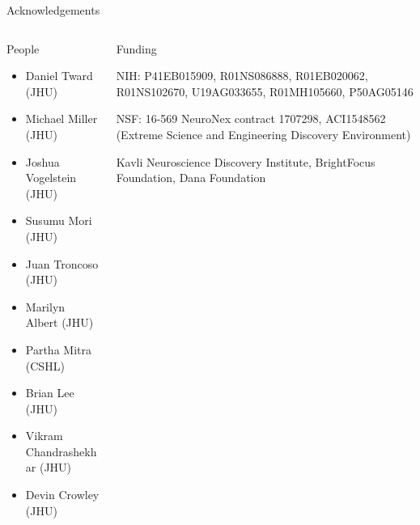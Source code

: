 \documentclass{beamer}
\begin{document}
\begin{frame}{Acknowledgements}

\begin{columns}
\begin{column}{0.5\textwidth}
People
\begin{itemize}
\item Daniel Tward (JHU)
\item Michael Miller (JHU)
\item Joshua Vogelstein (JHU)
\item Susumu Mori (JHU)
\item Juan Troncoso (JHU)
\item Marilyn Albert (JHU)
\item Partha Mitra (CSHL)
\item Brian Lee (JHU)
\item Vikram Chandrashekhar (JHU)
\item Devin Crowley (JHU)

\end{itemize}
\end{column}

\begin{column}{0.5\textwidth}
Funding

\vspace{1em}

NIH: P41EB015909, R01NS086888, R01EB020062, R01NS102670, U19AG033655, R01MH105660, P50AG05146

\vspace{1em}

NSF: 16-569 NeuroNex contract 1707298, ACI1548562 (Extreme Science and Engineering Discovery Environment)

\vspace{1em}

Kavli Neuroscience Discovery Institute, BrightFocus Foundation, Dana Foundation

\end{column}
\end{columns}

\end{frame}
\end{document}
